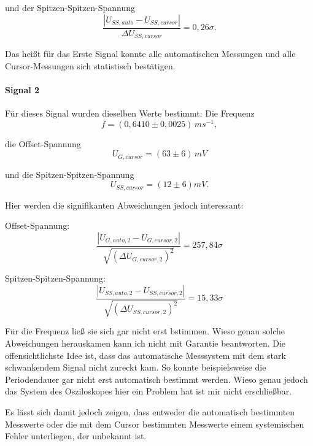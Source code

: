 und der Spitzen-Spitzen-Spannung
\begin{equation}
    \frac{\left| U_{SS,auto} - U_{SS,cursor} \right|}{\Delta U_{SS,cursor}} = 0,26\sigma.
\end{equation}
 
Das heißt für das Erste Signal konnte alle automatischen Messungen und alle Cursor-Messungen sich statistisch bestätigen.

\paragraph{Signal 2} Für dieses Signal wurden dieselben Werte bestimmt:
Die Frequenz
\begin{equation}
\boxed{
    f = (0,6410 \pm 0,0025) \, ms^{-1}
},
\end{equation}

die Offset-Spannung
\begin{equation}
\boxed{
    U_{G,cursor} = (63 \pm 6) \, mV
}
\end{equation}

und die Spitzen-Spitzen-Spannung
\begin{equation}
    \boxed{
        U_{SS,cursor} = (12 \pm 6) mV
    }.
\end{equation}

Hier werden die signifikanten Abweichungen jedoch interessant: 

Offset-Spannung:
\begin{equation}
    \frac{\left| U_{G,auto,2} - U_{G,cursor,2} \right|}{\sqrt{(\Delta U_{G,cursor,2})^2}} = 257,84\sigma
\end{equation}

Spitzen-Spitzen-Spannung:
\begin{equation}
    \frac{\left| U_{SS,auto,2} - U_{SS,cursor,2} \right|}{\sqrt{(\Delta U_{SS,cursor,2})^2}} = 15,33\sigma
\end{equation}

Für die Frequenz ließ sie sich gar nicht erst bstimmen. Wieso genau solche Abweichungen herauskamen kann ich nicht mit Garantie beantworten. Die offensichtlichste Idee ist, dass das automatische Messsystem mit dem stark schwankendem Signal nicht zureckt kam. So konnte beispielsweise die Periodendauer gar nicht erst automatisch bestimmt werden. Wieso genau jedoch das System des Osziloskopes hier ein Problem hat ist mir nicht erschließbar.

Es lässt sich damit jedoch zeigen, dass entweder die automatisch bestimmten Messwerte oder die mit dem Cursor bestimmten Messwerte einem systemischen Fehler unterliegen, der unbekannt ist.

